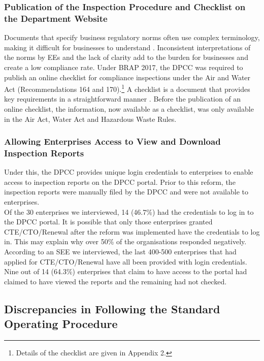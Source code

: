\documentclass[a4paper, 12pt]{article}
\begin{document}
	\subsubsection{ Publication of the Inspection Procedure and Checklist on the Department Website}
	
	Documents that specify business regulatory norms often use complex terminology, making it difficult for businesses to understand \parencite{OECD14}. Inconsistent interpretations of the norms by EEs and the lack of clarity add to the burden for businesses and create a low compliance rate. Under BRAP 2017, the DPCC was required to publish an online checklist for compliance inspections under the Air and Water Act (Recommendations 164 and 170).\footnote{Details of the checklist are given in Appendix 2.} A checklist is a document that provides key requirements in a straightforward manner \parencite{OECD14}. Before the publication of an online checklist, the information, now available as a checklist, was only available in the Air Act, Water Act and Hazardous Waste Rules. 
	
	\subsubsection{Allowing Enterprises Access to View and Download Inspection Reports}
	
	Under this, the DPCC provides unique login credentials to enterprises to enable access to inspection reports on the DPCC portal. Prior to this reform, the inspection reports were manually filed by the DPCC and were not available to enterprises. \\
	
	Of the 30 enterprises we interviewed, 14 (46.7\%) had the credentials to log in to the DPCC portal. It is possible that only those enterprises granted CTE/CTO/Renewal after the reform was implemented have the credentials to log in. This may explain why over 50\% of the organisations responded negatively. According to an SEE we interviewed, the last 400-500 enterprises that had applied for CTE/CTO/Renewal have all been provided with login credentials. \\
	
	Nine out of 14 (64.3\%) enterprises that claim to have access to the portal had claimed to have viewed the reports and the remaining had not checked. 
	
	\subsection{Discrepancies in Following the Standard Operating Procedure}
	
\end{document}
